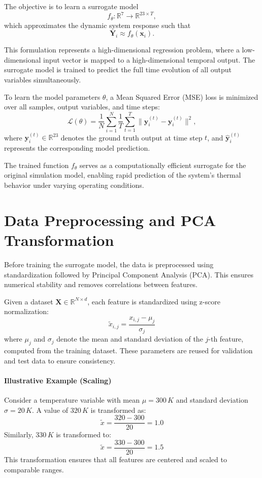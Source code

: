 The objective is to learn a surrogate model
\[
f_{\theta}: \mathbb{R}^7 \rightarrow \mathbb{R}^{23 \times T},
\]
which approximates the dynamic system response such that
\[
\mathbf{Y}_i \approx f_{\theta}(\mathbf{x}_i).
\]

This formulation represents a high-dimensional regression problem, where a low-dimensional input vector is mapped to a high-dimensional temporal output. The surrogate model is trained to predict the full time evolution of all output variables simultaneously.

To learn the model parameters \( \theta \), a Mean Squared Error (MSE) loss is minimized over all samples, output variables, and time steps:
\[
\mathcal{L}(\theta) = \frac{1}{N} \sum_{i=1}^{N} \frac{1}{T} \sum_{t=1}^{T} 
\| \mathbf{y}_i^{(t)} - \hat{\mathbf{y}}_i^{(t)} \|^2,
\]
where \( \mathbf{y}_i^{(t)} \in \mathbb{R}^{23} \) denotes the ground truth output at time step \( t \), and \( \hat{\mathbf{y}}_i^{(t)} \) represents the corresponding model prediction.

The trained function \( f_{\theta} \) serves as a computationally efficient surrogate for the original simulation model, enabling rapid prediction of the system’s thermal behavior under varying operating conditions.


\section{Data Preprocessing and PCA Transformation}

Before training the surrogate model, the data is preprocessed using standardization followed by Principal Component Analysis (PCA). This ensures numerical stability and removes correlations between features.

Given a dataset \( \mathbf{X} \in \mathbb{R}^{N \times d} \), each feature is standardized using z-score normalization:
\[
\tilde{x}_{i,j} = \frac{x_{i,j} - \mu_j}{\sigma_j}
\]
where \( \mu_j \) and \( \sigma_j \) denote the mean and standard deviation of the \( j \)-th feature, computed from the training dataset. These parameters are reused for validation and test data to ensure consistency.

\paragraph{Illustrative Example (Scaling)}
Consider a temperature variable with mean \( \mu = 300\,K \) and standard deviation \( \sigma = 20\,K \). A value of \( 320\,K \) is transformed as:
\[
\tilde{x} = \frac{320 - 300}{20} = 1.0
\]
Similarly, \( 330\,K \) is transformed to:
\[
\tilde{x} = \frac{330 - 300}{20} = 1.5
\]
This transformation ensures that all features are centered and scaled to comparable ranges.

